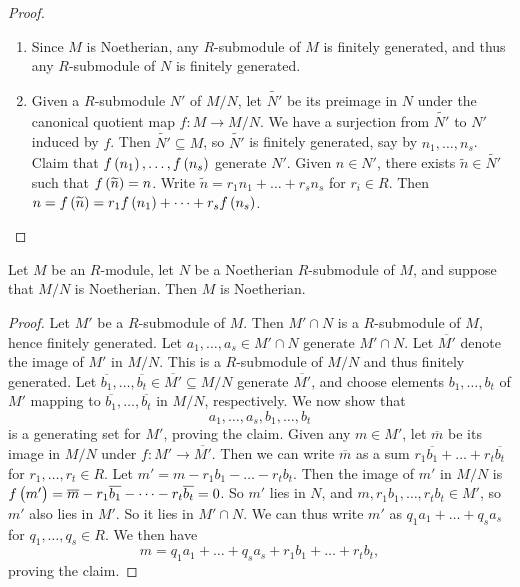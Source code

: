 \begin{proof}
\hfill
\begin{enumerate}
\item Since $ M $ is Noetherian, any $ R $-submodule of $ M $ is finitely generated, and thus any $ R $-submodule of $ N $ is finitely generated.
\item Given a $ R $-submodule $ N' $ of $ M / N $, let $ \widetilde{N'} $ be its preimage in $ N $ under the canonical quotient map $ f : M \to M / N $. We have a surjection from $ \widetilde{N'} $ to $ N' $ induced by $ f $. Then $ \widetilde{N'} \subseteq M $, so $ \widetilde{N'} $ is finitely generated, say by $ n_1, \dots, n_s $. Claim that $ f\br{n_1}, \dots, f\br{n_s} $ generate $ N' $. Given $ n \in N' $, there exists $ \widetilde{n} \in \widetilde{N'} $ such that $ f\br{\widetilde{n}} = n $. Write $ \widetilde{n} = r_1n_1 + \dots + r_sn_s $ for $ r_i \in R $. Then $ n = f\br{\widetilde{n}} = r_1f\br{n_1} + \dots + r_sf\br{n_s} $.
\end{enumerate}
\end{proof}

\begin{proposition}
Let $ M $ be an $ R $-module, let $ N $ be a Noetherian $ R $-submodule of $ M $, and suppose that $ M / N $ is Noetherian. Then $ M $ is Noetherian.
\end{proposition}

\begin{proof}
Let $ M' $ be a $ R $-submodule of $ M $. Then $ M' \cap N $ is a $ R $-submodule of $ M $, hence finitely generated. Let $ a_1, \dots, a_s \in M' \cap N $ generate $ M' \cap N $. Let $ \overline{M'} $ denote the image of $ M' $ in $ M / N $. This is a $ R $-submodule of $ M / N $ and thus finitely generated. Let $ \overline{b_1}, \dots, \overline{b_t} \in \overline{M'} \subseteq M / N $ generate $ \overline{M'} $, and choose elements $ b_1, \dots, b_t $ of $ M' $ mapping to $ \overline{b_1}, \dots, \overline{b_t} $ in $ M / N $, respectively. We now show that
$$ a_1, \dots, a_s, b_1, \dots, b_t $$
is a generating set for $ M' $, proving the claim. Given any $ m \in M' $, let $ \overline{m} $ be its image in $ M / N $ under $ f : M' \to \overline{M'} $. Then we can write $ \overline{m} $ as a sum $ r_1\overline{b_1} + \dots + r_t\overline{b_t} $ for $ r_1, \dots, r_t \in R $. Let $ m' = m - r_1b_1 - \dots - r_tb_t $. Then the image of $ m' $ in $ M / N $ is $ f\br{m'} = \overline{m} - r_1\overline{b_1} - \dots - r_t\overline{b_t} = 0 $. So $ m' $ lies in $ N $, and $ m, r_1b_1, \dots, r_tb_t \in M' $, so $ m' $ also lies in $ M' $. So it lies in $ M' \cap N $. We can thus write $ m' $ as $ q_1a_1 + \dots + q_sa_s $ for $ q_1, \dots, q_s \in R $. We then have
$$ m = q_1a_1 + \dots + q_sa_s + r_1b_1 + \dots + r_tb_t, $$
proving the claim.
\end{proof}

